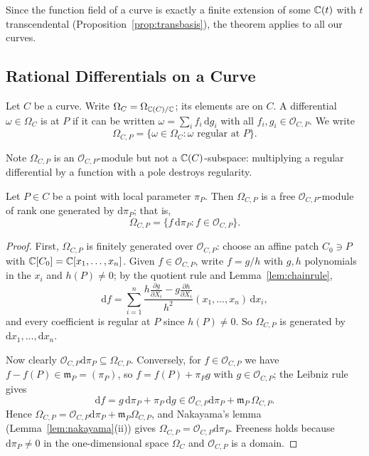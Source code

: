 \documentclass[a4paper]{scrartcl}
\newcommand{\mm}{\mathfrak{m}}
\newcommand{\Oh}{\mathcal{O}}
\newcommand{\dee}{\mathrm{d}}
\begin{document}
Since the function field of a curve is exactly a finite extension of some $\mathbb{C}(t)$ with $t$ transcendental (Proposition~\ref{prop:transbasis}), the theorem applies to all our curves.

\subsection{Rational Differentials on a Curve}

\begin{definition}
	Let $C$ be a curve. Write $\Omega_C = \Omega_{\mathbb{C}(C)/\mathbb{C}}$; its elements are  on $C$. A differential $\omega \in \Omega_C$ is  at $P$ if it can be written $\omega = \sum_i f_i\,\dee g_i$ with all $f_i,g_i \in \Oh_{C,P}$. We write
	$$\Omega_{C,P} = \{\omega \in \Omega_C : \omega \text{ regular at } P\}.$$
\end{definition}

Note $\Omega_{C,P}$ is an $\Oh_{C,P}$-module but not a $\mathbb{C}(C)$-subspace: multiplying a regular differential by a function with a pole destroys regularity.

\begin{theorem}\label{thm:omegafree}
	Let $P \in C$ be a point with local parameter $\pi_P$. Then $\Omega_{C,P}$ is a free $\Oh_{C,P}$-module of rank one generated by $\dee\pi_P$; that is,
	$$\Omega_{C,P} = \{f\,\dee\pi_P : f \in \Oh_{C,P}\}.$$
\end{theorem}

\begin{proof}
	First, $\Omega_{C,P}$ is finitely generated over $\Oh_{C,P}$: choose an affine patch $C_0 \ni P$ with $\mathbb{C}[C_0] = \mathbb{C}[x_1,\dots,x_n]$. Given $f \in \Oh_{C,P}$, write $f = g/h$ with $g,h$ polynomials in the $x_i$ and $h(P)\neq0$; by the quotient rule and Lemma~\ref{lem:chainrule},
	$$\dee f = \sum_{i=1}^n \frac{h\frac{\partial g}{\partial X_i} - g\frac{\partial h}{\partial X_i}}{h^2}(x_1,\dots,x_n)\,\dee x_i,$$
	and every coefficient is regular at $P$ since $h(P)\neq0$. So $\Omega_{C,P}$ is generated by $\dee x_1,\dots,\dee x_n$.

	Now clearly $\Oh_{C,P}\dee\pi_P \subseteq \Omega_{C,P}$. Conversely, for $f \in \Oh_{C,P}$ we have $f - f(P) \in \mm_P = (\pi_P)$, so $f = f(P) + \pi_P g$ with $g \in \Oh_{C,P}$; the Leibniz rule gives
	$$\dee f = g\,\dee\pi_P + \pi_P\,\dee g \in \Oh_{C,P}\dee\pi_P + \mm_P\,\Omega_{C,P}.$$
	Hence $\Omega_{C,P} = \Oh_{C,P}\dee\pi_P + \mm_P\Omega_{C,P}$, and Nakayama's lemma (Lemma~\ref{lem:nakayama}(ii)) gives $\Omega_{C,P} = \Oh_{C,P}\dee\pi_P$. Freeness holds because $\dee\pi_P \neq 0$ in the one-dimensional space $\Omega_C$ and $\Oh_{C,P}$ is a domain.
\end{proof}
\end{document}
